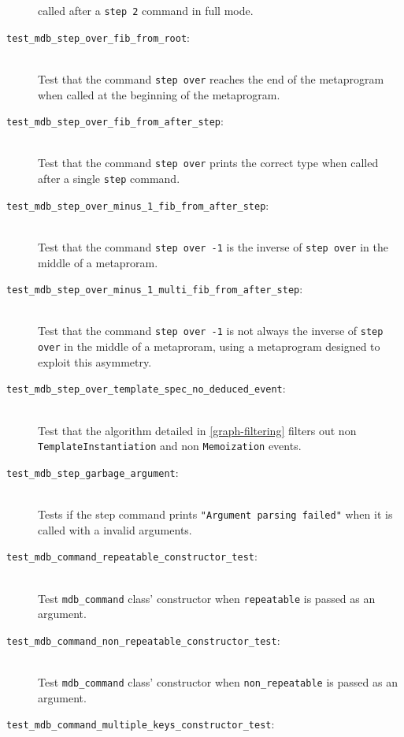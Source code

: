 \begin{description}
        called after a \texttt{step 2} command in full mode.
    \item[\texttt{test\_mdb\_step\_over\_fib\_from\_root}:] \hfill \\
        Test that the command \texttt{step over} reaches the end of the
        metaprogram when called at the beginning of the metaprogram.
    \item[\texttt{test\_mdb\_step\_over\_fib\_from\_after\_step}:] \hfill \\
        Test that the command \texttt{step over} prints the correct type when
        called after a single \texttt{step} command.
    \item[\texttt{test\_mdb\_step\_over\_minus\_1\_fib\_from\_after\_step}:] \hfill \\
        Test that the command \texttt{step over -1} is the inverse of
        \texttt{step over} in the middle of a metaproram.
    \item[\texttt{test\_mdb\_step\_over\_minus\_1\_multi\_fib\_from\_after\_step}:] \hfill \\
        Test that the command \texttt{step over -1} is not always the inverse
        of \texttt{step over} in the middle of a metaproram, using a
        metaprogram designed to exploit this asymmetry.
    \item[\texttt{test\_mdb\_step\_over\_template\_spec\_no\_deduced\_event}:] \hfill \\
        Test that the algorithm detailed in \ref{graph-filtering} filters out
        non \texttt{TemplateInstantiation} and non \texttt{Memoization} events.
    \item[\texttt{test\_mdb\_step\_garbage\_argument}:] \hfill \\
        Tests if the step command prints
        \texttt{"Argument parsing failed"} when it is called with a invalid
        arguments.
    \item[\texttt{test\_mdb\_command\_repeatable\_constructor\_test}:] \hfill \\
        Test \texttt{mdb\_command} class' constructor when \texttt{repeatable}
        is passed as an argument.
    \item[\texttt{test\_mdb\_command\_non\_repeatable\_constructor\_test}:] \hfill \\
        Test \texttt{mdb\_command} class' constructor when
        \texttt{non\_repeatable} is passed as an argument.
    \item[\texttt{test\_mdb\_command\_multiple\_keys\_constructor\_test}:] \hfill \\

\end{description}
